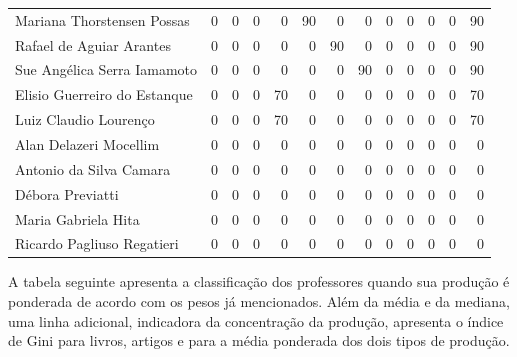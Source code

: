 \documentclass[12pt,brazil]{article}\usepackage[]{graphicx}\usepackage[]{xcolor}
\newcounter{tabela}
\begin{document}
\begin{longtable}{lrrrrrrrrrrrr}
Mariana Thorstensen Possas & 0 & 0 & 0 & 0 & 90 & 0 & 0 & 0 & 0 & 0 & 0 & 90 \\
Rafael de Aguiar Arantes & 0 & 0 & 0 & 0 & 0 & 90 & 0 & 0 & 0 & 0 & 0 & 90 \\
Sue Angélica Serra Iamamoto & 0 & 0 & 0 & 0 & 0 & 0 & 90 & 0 & 0 & 0 & 0 & 90 \\
Elisio Guerreiro do Estanque & 0 & 0 & 0 & 70 & 0 & 0 & 0 & 0 & 0 & 0 & 0 & 70 \\
Luiz Claudio Lourenço & 0 & 0 & 0 & 70 & 0 & 0 & 0 & 0 & 0 & 0 & 0 & 70 \\
Alan Delazeri Mocellim & 0 & 0 & 0 & 0 & 0 & 0 & 0 & 0 & 0 & 0 & 0 & 0 \\
Antonio da Silva Camara & 0 & 0 & 0 & 0 & 0 & 0 & 0 & 0 & 0 & 0 & 0 & 0 \\
Débora Previatti & 0 & 0 & 0 & 0 & 0 & 0 & 0 & 0 & 0 & 0 & 0 & 0 \\
\hline Maria Gabriela Hita & 0 & 0 & 0 & 0 & 0 & 0 & 0 & 0 & 0 & 0 & 0 & 0 \\
Ricardo Pagliuso Regatieri & 0 & 0 & 0 & 0 & 0 & 0 & 0 & 0 & 0 & 0 & 0 & 0 \\
\end{longtable}


\clearpage

A tabela seguinte apresenta a classificação dos professores quando sua
produção é ponderada de acordo com os pesos já mencionados. Além da média e da
mediana, uma linha adicional, indicadora da concentração da produção,
apresenta o índice de Gini para livros, artigos e para a média ponderada dos
dois tipos de produção.
\end{document}
